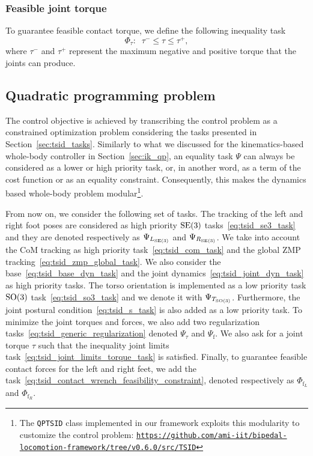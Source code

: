 \subsubsection{Feasible joint torque}
To guarantee feasible contact torque, we define the following inequality task
\begin{equation}
    \label{eq:tsid_joint_limits_torque_task}
    \Phi_\tau:\;\; \tau^{-} \le \tau \le \tau^+,
\end{equation}
where $\tau^{-}$ and $\tau^+$ represent the maximum negative and positive torque that the joints can produce. 

\subsection{Quadratic programming problem \label{sec:tsid_optimal_control_problem}}
The control objective is achieved by transcribing the control problem as a constrained optimization problem considering the tasks presented in Section~\ref{sec:tsid_tasks}.
Similarly to what we discussed for the kinematics-based whole-body controller in Section~\ref{sec:ik_qp}, an equality task $\Psi$ can always be considered as a lower or high priority task, or, in another word, as a term of the cost function or as an equality constraint. Consequently, this makes the dynamics based whole-body problem modular\footnote{The \texttt{QPTSID} class implemented in our framework exploits this modularity to customize the control problem: \href{https://github.com/ami-iit/bipedal-locomotion-framework/tree/v0.6.0/src/TSID}{\texttt{https://github.com/ami-iit/bipedal-locomotion-framework/tree/v0.6.0/src/TSID}}}. 
\par
From now on, we consider the following set of tasks.
The tracking of the left and right foot poses are considered as high priority ${\mathrm{SE}}(3)$ tasks~\eqref{eq:tsid_se3_task} and they are denoted respectively as $\Psi_{L_{{\mathrm{SE}}(3)}}$ and $\Psi_{R_{{\mathrm{SE}}(3)}}$. We take into account the CoM tracking as high priority task~\eqref{eq:tsid_com_task} and the global ZMP tracking~\eqref{eq:tsid_zmp_global_task}. We also consider the base~\eqref{eq:tsid_base_dyn_task} and the joint dynamics~\eqref{eq:tsid_joint_dyn_task} as high priority tasks. 
The torso orientation is implemented as a low priority task $\mathrm{SO}(3)$ task~\eqref{eq:tsid_so3_task} and we denote it with $\Psi_{T_{\mathrm{SO}(3)}}$. Furthermore, the joint postural condition~\eqref{eq:tsid_s_task} is also added as a low priority task. To minimize the joint torques and forces, we also add two regularization tasks~\eqref{eq:tsid_generic_regularization} denoted $\Psi_\tau$ and $\Psi_\mathrm{f}$. We also ask for a joint torque $\tau$ such that the inequality joint limits task~\eqref{eq:tsid_joint_limits_torque_task} is satisfied. Finally, to guarantee feasible contact forces for the left and right feet, we add the task~\eqref{eq:tsid_contact_wrench_feasibility_constraint}, denoted respectively as $\Phi_{\mathrm{f}_L}$ and $\Phi_{\mathrm{f}_R}$.
